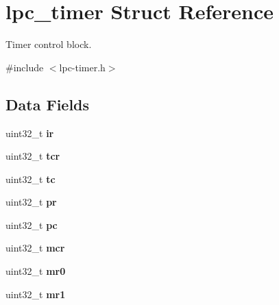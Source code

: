 \hypertarget{structlpc__timer}{}\section{lpc\+\_\+timer Struct Reference}
\label{structlpc__timer}


Timer control block.  




{\ttfamily \#include $<$lpc-\/timer.\+h$>$}

\subsection*{Data Fields}
\begin{DoxyCompactItemize}
\item 
\mbox{\label{structlpc__timer_a869289e1ab588ba54f8db3fe63be07b1}} 
uint32\+\_\+t {\bfseries ir}
\item 
\mbox{\label{structlpc__timer_aaf6f47912ca89d79751c473cf9c14156}} 
uint32\+\_\+t {\bfseries tcr}
\item 
\mbox{\label{structlpc__timer_a6bb6c9f819137069cb61a0c893bed9c4}} 
uint32\+\_\+t {\bfseries tc}
\item 
\mbox{\label{structlpc__timer_abd113ee41f5fa4c7c27a63cd9c9789e1}} 
uint32\+\_\+t {\bfseries pr}
\item 
\mbox{\label{structlpc__timer_acf805cfa0788efade4038cb6557b7c11}} 
uint32\+\_\+t {\bfseries pc}
\item 
\mbox{\label{structlpc__timer_ab8bfad14c1ddc7e20ebcbf95277fb683}} 
uint32\+\_\+t {\bfseries mcr}
\item 
\mbox{\label{structlpc__timer_aa2875cef4fc6a7aa44c59c35a1a57122}} 
uint32\+\_\+t {\bfseries mr0}
\item 
\mbox{\label{structlpc__timer_a07063855006791c2fb0628ab8b59b33f}} 
uint32\+\_\+t {\bfseries mr1}
\item 
\mbox{\label{structlpc__timer_a6eaa49d7c76c5675e2cdc00449849b0e}} 

\end{DoxyCompactItemize}
